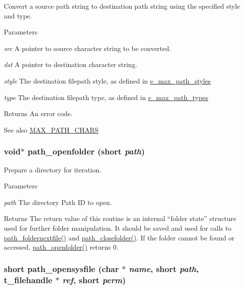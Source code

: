 Convert a source path string to destination path string using the specified style and type. 
\begin{DoxyParams}{Parameters}
\item[{\em src}]A pointer to source character string to be converted. \item[{\em dst}]A pointer to destination character string. \item[{\em style}]The destination filepath style, as defined in \hyperlink{group__files_gaaf8f3fbe8b4ab0b73258a6b782461867}{e\_\-max\_\-path\_\-styles} \item[{\em type}]The destination filepath type, as defined in \hyperlink{group__files_gac6a8a4db7a7de5fbc21188399713c7ee}{e\_\-max\_\-path\_\-types} \end{DoxyParams}
\begin{DoxyReturn}{Returns}
An error code.
\end{DoxyReturn}
\begin{DoxySeeAlso}{See also}
\hyperlink{group__files_ga513fe2710e225c840d9295fb9884607b}{MAX\_\-PATH\_\-CHARS} 
\end{DoxySeeAlso}
\hypertarget{group__files_ga80aa97732be321d9f2e2212485e0367a}{
\subsubsection[{path\_\-openfolder}]{\setlength{\rightskip}{0pt plus 5cm}void$\ast$ path\_\-openfolder (short {\em path})}}
\label{group__files_ga80aa97732be321d9f2e2212485e0367a}


Prepare a directory for iteration. 
\begin{DoxyParams}{Parameters}
\item[{\em path}]The directory Path ID to open. \end{DoxyParams}
\begin{DoxyReturn}{Returns}
The return value of this routine is an internal “folder state” structure used for further folder manipulation. It should be saved and used for calls to \hyperlink{group__files_ga50f5d1b1d008024bffd65155be7e2721}{path\_\-foldernextfile()} and \hyperlink{group__files_ga63ca3fd6e4acb9f1b1e56b2d609bf4af}{path\_\-closefolder()}. If the folder cannot be found or accessed, \hyperlink{group__files_ga80aa97732be321d9f2e2212485e0367a}{path\_\-openfolder()} returns 0. 
\end{DoxyReturn}
\hypertarget{group__files_gaf244aeb070e1903461070cd7dbe04bf4}{
\subsubsection[{path\_\-opensysfile}]{\setlength{\rightskip}{0pt plus 5cm}short path\_\-opensysfile (char $\ast$ {\em name}, \/  short {\em path}, \/  {\bf t\_\-filehandle} $\ast$ {\em ref}, \/  short {\em perm})}}
\label{group__files_gaf244aeb070e1903461070cd7dbe04bf4}


